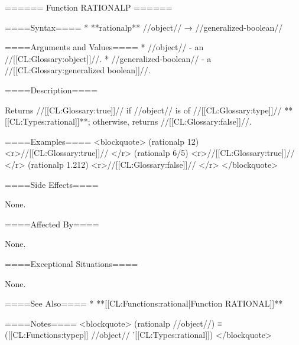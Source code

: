 ====== Function RATIONALP ======

====Syntax====
  * **rationalp** //object// → //generalized-boolean//

====Arguments and Values====
  * //object// - an //[[CL:Glossary:object]]//.
  * //generalized-boolean// - a //[[CL:Glossary:generalized boolean]]//.

====Description====

Returns //[[CL:Glossary:true]]// if //object// is of //[[CL:Glossary:type]]// **[[CL:Types:rational]]**; otherwise, returns //[[CL:Glossary:false]]//.

====Examples====
<blockquote> 
(rationalp 12) <r>//[[CL:Glossary:true]]// </r>
(rationalp 6/5) <r>//[[CL:Glossary:true]]// </r>
(rationalp 1.212) <r>//[[CL:Glossary:false]]// </r>
</blockquote>

====Side Effects====

None.

====Affected By====

None.

====Exceptional Situations====

None.

====See Also====
  * **[[CL:Functions:rational|Function RATIONAL]]**

====Notes==== 
<blockquote> 
(rationalp //object//) ≡ ([[CL:Functions:typep]] //object// '[[CL:Types:rational]]) 
</blockquote>

